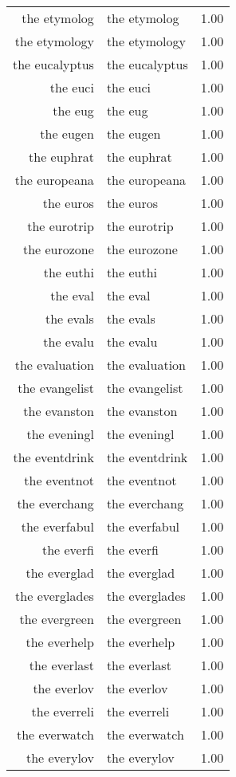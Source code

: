 \begin{table}[ht]
\begin{tabular}{rlr}
  the etymolog & the etymolog & 1.00 \\ 
  the etymology & the etymology & 1.00 \\ 
  the eucalyptus & the eucalyptus & 1.00 \\ 
  the euci & the euci & 1.00 \\ 
  the eug & the eug & 1.00 \\ 
  the eugen & the eugen & 1.00 \\ 
  the euphrat & the euphrat & 1.00 \\ 
  the europeana & the europeana & 1.00 \\ 
  the euros & the euros & 1.00 \\ 
  the eurotrip & the eurotrip & 1.00 \\ 
  the eurozone & the eurozone & 1.00 \\ 
  the euthi & the euthi & 1.00 \\ 
  the eval & the eval & 1.00 \\ 
  the evals & the evals & 1.00 \\ 
  the evalu & the evalu & 1.00 \\ 
  the evaluation & the evaluation & 1.00 \\ 
  the evangelist & the evangelist & 1.00 \\ 
  the evanston & the evanston & 1.00 \\ 
  the eveningl & the eveningl & 1.00 \\ 
  the eventdrink & the eventdrink & 1.00 \\ 
  the eventnot & the eventnot & 1.00 \\ 
  the everchang & the everchang & 1.00 \\ 
  the everfabul & the everfabul & 1.00 \\ 
  the everfi & the everfi & 1.00 \\ 
  the everglad & the everglad & 1.00 \\ 
  the everglades & the everglades & 1.00 \\ 
  the evergreen & the evergreen & 1.00 \\ 
  the everhelp & the everhelp & 1.00 \\ 
  the everlast & the everlast & 1.00 \\ 
  the everlov & the everlov & 1.00 \\ 
  the everreli & the everreli & 1.00 \\ 
  the everwatch & the everwatch & 1.00 \\ 
  the everylov & the everylov & 1.00 \\ 

\end{tabular}
\end{table}
